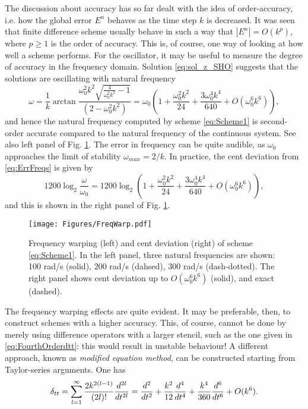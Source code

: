 The discussion about accuracy has so far dealt with the idea of order-accuracy, i.e. how the global error $E^n$ behaves as the time step $k$ is decreased. It was seen that finite difference scheme usually behave in such a way that $|E^n| = O(k^p)$, where $p \geq  1$ is the order of accuracy. This is, of course, one way of looking at how well a scheme performs. For the oscillator, it may be useful to measure the degree of accuracy in the frequency domain. Solution \eqref{eq:sol_z_SHO} suggests that the solutions are oscillating with natural frequency
\begin{equation}\label{eq:ErrFreqs}
    \omega = \frac{1}{k}\arctan{\frac{\omega_0^2k^2\sqrt{\frac{4}{\omega_0^2 k^2}-1}}{(2-\omega_0^2 k^2)}} = \omega_0 \left(1 + \frac{\omega_0^2 k^2}{24} +  \frac{3 \omega_0^4 k^4}{640} + O(\omega_0^6k^6) \right),
\end{equation} 
and hence the natural frequency computed by  scheme \eqref{eq:Scheme1} is second-order accurate compared to the natural frequency of the continuous system. See also left panel of Fig. \ref{eq:FreqWarping}. The error in frequency can be quite audible, as $\omega_0$ approaches the limit of stability $\omega_{max}=2/k$. In practice, the cent deviation from \eqref{eq:ErrFreqs} is given by
\begin{equation}
    1200 \log_{2}\frac{\omega}{\omega_0} = 1200\log_2\left(1 + \frac{\omega_0^2 k^2}{24} +  \frac{3 \omega_0^4 k^4}{640} + O(\omega_0^6k^6) \right), 
\end{equation}
and this is shown in the right panel of Fig. \ref{eq:FreqWarping}.
\begin{figure}
    \texttt{[image: Figures/FreqWarp.pdf]}
    \caption{Frequency warping (left) and cent deviation (right) of scheme \eqref{eq:Scheme1}. In the left panel, three natural frequencies are shown: 100 rad/s (solid), 200 rad/s (dahsed), 300 rad/s (dash-dotted). The right panel shows cent deviation up to $O(\omega_0^6k^6)$ (solid), and exact (dashed).}\label{eq:FreqWarping}
\end{figure}
The frequency warping effects are quite evident. It may be preferable, then, to construct schemes with a higher accuracy. This, of course, cannot be done by merely using difference operators with a larger stencil, such as the one given in \eqref{eq:FourthOrderdtt}: this would result in unstable behaviour! A different approach, known as \emph{modified equation method}, can be constructed starting from Taylor-series arguments. One has
\begin{equation}\label{eq:dttExpasion}
    \delta_{tt} = \sum_{l=1}^{\infty}\frac{2k^{2(l-1)}}{(2l)!}\frac{d^{2l}}{dt^{2l}}= \frac{d^2}{dt^2} + \frac{k^2}{12}\frac{d^4}{dt^4} + \frac{k^4}{360}\frac{d^6}{dt^6} + O(k^6).
\end{equation}
